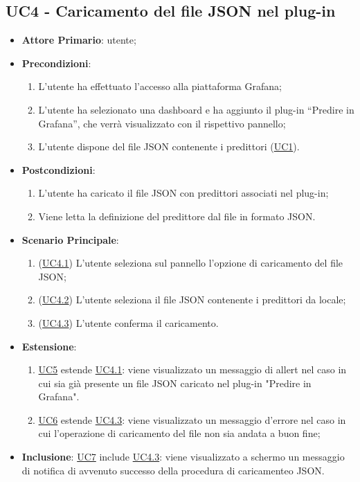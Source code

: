 	\subsection{UC4 - Caricamento del file JSON nel plug-in}
		\begin{itemize}
			\item\textbf{Attore Primario}: utente;
			\item\textbf{Precondizioni}: 
				\begin{enumerate}
					\item L’utente ha effettuato l’accesso alla piattaforma Grafana;
					\item L’utente ha selezionato una dashboard e ha aggiunto il plug-in “Predire in Grafana”,  che verrà visualizzato con il rispettivo pannello;
					\item L’utente dispone del file JSON contenente i predittori (\hyperref[par:UC1]{UC1}). 
				\end{enumerate}
			\item\textbf{Postcondizioni}:
				\begin{enumerate}
					\item L’utente ha caricato il file JSON con predittori associati nel plug-in;
					\item Viene letta la definizione del predittore dal file in formato JSON. 
				\end{enumerate}
			\item\textbf{Scenario Principale}:
				\begin{enumerate}
					\item (\hyperref[par:UC4.1]{UC4.1}) L’utente seleziona sul pannello l’opzione di caricamento del file JSON; 
					\item (\hyperref[par:UC4.2]{UC4.2}) L’utente seleziona il file JSON contenente i predittori da locale;
					\item (\hyperref[par:UC4.3]{UC4.3}) L'utente conferma il caricamento.
				\end{enumerate}
			\item\textbf{Estensione}:
				\begin{enumerate} 
					\item\hyperref[par:UC5]{UC5} estende \hyperref[par:UC4.1]{UC4.1}: viene visualizzato un messaggio di allert nel caso in cui sia già presente un file JSON caricato nel plug-in "Predire in Grafana".
					\item\hyperref[par:UC6]{UC6} estende \hyperref[par:UC4.3]{UC4.3}: viene visualizzato un messaggio d’errore nel caso in cui l’operazione di caricamento del file non sia andata a buon fine;
				\end{enumerate}	
			\item\textbf{Inclusione}: \hyperref[par:UC7]{UC7} include \hyperref[par:UC4.3]{UC4.3}: viene visualizzato a schermo un messaggio di notifica di avvenuto successo della procedura di caricamenteo JSON.
		\end{itemize}
		
